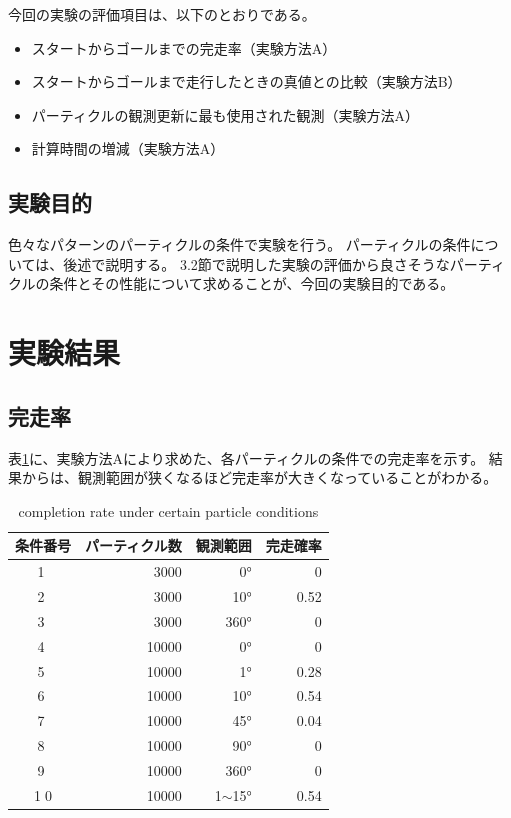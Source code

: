 \documentclass{jarticle}
\begin{document}
今回の実験の評価項目は、以下のとおりである。
\begin{itemize}
  \item スタートからゴールまでの完走率（実験方法A）
  \item スタートからゴールまで走行したときの真値との比較（実験方法B）
  \item パーティクルの観測更新に最も使用された観測（実験方法A）
  \item 計算時間の増減（実験方法A）
\end{itemize}

\subsection{実験目的}

色々なパターンのパーティクルの条件で実験を行う。
パーティクルの条件については、後述で説明する。
3.2節で説明した実験の評価から良さそうなパーティクルの条件とその性能について求めることが、今回の実験目的である。

\section{実験結果}%

\subsection{完走率}

表\ref{table:完走率}に、実験方法Aにより求めた、各パーティクルの条件での完走率を示す。
結果からは、観測範囲が狭くなるほど完走率が大きくなっていることがわかる。

\begin{table}[htbp]
  \caption{completion rate under certain particle conditions}
  \label{table:完走率}
  \begin{tabular}{|c|r|r|r|} \hline
  条件番号 & パーティクル数 & 観測範囲  & 完走確率 \\ \hline \hline
  \textcircled{\scriptsize 1} & 3000 & 0° & 0 \\ \hline
  \textcircled{\scriptsize 2} & 3000 & 10° & 0.52 \\ \hline
  \textcircled{\scriptsize 3} & 3000 & 360° & 0 \\ \hline
  \textcircled{\scriptsize 4} & 10000 & 0° & 0 \\ \hline
  \textcircled{\scriptsize 5} & 10000 & 1° & 0.28 \\ \hline
  \textcircled{\scriptsize 6} & 10000 & 10° & 0.54 \\ \hline
  \textcircled{\scriptsize 7} & 10000 & 45° & 0.04 \\ \hline
  \textcircled{\scriptsize 8} & 10000 & 90° & 0 \\ \hline
  \textcircled{\scriptsize 9} & 10000 & 360° & 0 \\ \hline
  \textcircled{\scriptsize 10} & 10000 & 1$\sim$15° & 0.54 \\ \hline
  \end{tabular}
\end{table}
\end{document}
